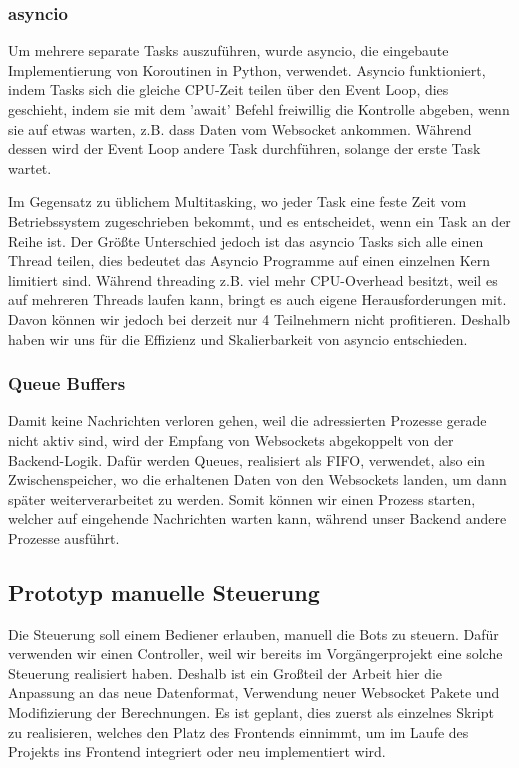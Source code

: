 \subsubsection{asyncio}
Um mehrere separate Tasks auszuführen, wurde asyncio,
die eingebaute Implementierung von Koroutinen in Python, verwendet.
% 
Asyncio funktioniert, 
indem Tasks sich die gleiche CPU-Zeit teilen über den Event Loop,
dies geschieht, indem sie mit dem 'await' Befehl freiwillig die Kontrolle abgeben,
wenn sie auf etwas warten, z.B. dass Daten vom Websocket ankommen.
Während dessen wird der Event Loop andere Task durchführen, 
solange der erste Task wartet.

Im Gegensatz zu üblichem Multitasking,
wo jeder Task eine feste Zeit vom Betriebssystem zugeschrieben bekommt, 
und es entscheidet, wenn ein Task an der Reihe ist.
% 
Der Größte Unterschied jedoch ist das asyncio Tasks sich alle einen Thread teilen,
dies bedeutet das Asyncio Programme auf einen einzelnen Kern limitiert sind.
% 
Während threading z.B. viel mehr CPU-Overhead besitzt, 
weil es auf mehreren Threads laufen kann, 
bringt es auch eigene Herausforderungen mit.
% 
Davon können wir jedoch bei derzeit nur 4 Teilnehmern nicht profitieren.
Deshalb haben wir uns für die Effizienz und Skalierbarkeit von asyncio entschieden.


\subsubsection{Queue Buffers}
Damit keine Nachrichten verloren gehen, 
weil die adressierten Prozesse gerade nicht aktiv sind,  
wird der Empfang von Websockets abgekoppelt von der Backend-Logik.
Dafür werden Queues, realisiert als FIFO, verwendet, also ein Zwischenspeicher, 
wo die erhaltenen Daten von den Websockets landen, 
um dann später weiterverarbeitet zu werden.
% 
Somit können wir einen Prozess starten, 
welcher auf eingehende Nachrichten warten kann,
während unser Backend andere Prozesse ausführt.

\subsection{Prototyp manuelle Steuerung}
Die Steuerung soll einem Bediener erlauben, manuell die Bots zu steuern. 
% 
Dafür verwenden wir einen Controller, 
weil wir bereits im Vorgängerprojekt
eine solche Steuerung realisiert haben. 
Deshalb ist ein Großteil der Arbeit hier die Anpassung an das neue Datenformat, 
Verwendung neuer Websocket Pakete und Modifizierung der Berechnungen.
% 
Es ist geplant, dies zuerst als einzelnes Skript zu realisieren, 
welches den Platz des Frontends einnimmt, 
um im Laufe des Projekts ins Frontend integriert oder neu implementiert wird.

